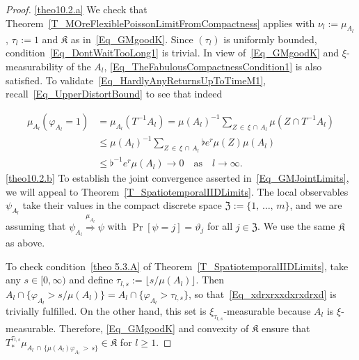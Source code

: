 \documentclass[10pt]{amsart}
\theoremstyle{definition}\newtheorem{defi}[theo]{Definition}\newtheorem{rema}[theo]{Remark}\newtheorem{exam}[theo]{Example}\newtheorem{exem}[theo]{Example}\newtheorem{nota}[theo]{Notation}
\newcommand{\frkK}{\mathfrak{K}}
\newcommand{\frkZ}{\mathfrak{Z}}
\begin{document}
\begin{proof}\leavevmode

\noindent\eqref{theo10.2.a} We check that Theorem~\ref{T_MOreFlexiblePoissonLimitFromCompactness} applies with $\nu_{l} :=\mu_{A_{l}}$, $\tau_{l}:=1$ and $\frkK$ as in~\eqref{Eq_GMgoodK}. Since $(\tau_{l})$ is uniformly bounded, condition~\eqref{Eq_DontWaitTooLong1} is trivial. In view of~\eqref{Eq_GMgoodK} and $\xi$-measurability of the $A_{l}$, \eqref{Eq_TheFabulousCompactnessCondition1} is also satisfied. To validate~\eqref{Eq_HardlyAnyReturnsUpToTimeM1}, recall~\eqref{Eq_UpperDistortBound} to see that indeed

\begin{align*}
\mu_{A_{l}}\left(\varphi_{A_{l}}=1\right) & =\mu_{A_{l}}\left(T^{-1}A_{l}\right) =\mu(A_{l})^{-1} {\textstyle\sum\nolimits_{Z\,\in\,\xi\,\cap\,A_{l}}}
\mu\left(Z\cap T^{-1}A_{l}\right)\\
& \leq\mu(A_{l})^{-1} {\textstyle\sum\nolimits_{Z\,\in\,\xi\,\cap\,A_{l}}}
\flat e^{r}\mu(Z)\mu(A_{l})\\
& \leq\flat^{-1}e^{r}\mu(A_{l})\longrightarrow0\quad\text{as}\quad l\rightarrow
\infty.
\end{align*}
\eqref{theo10.2.b} To establish the joint convergence asserted in~\eqref{Eq_GMJointLimits}, we will appeal to Theorem~\ref{T_SpatiotemporalIIDLimits}. The local observables $\psi_{A_{l}}$ take their values in the compact discrete space $\frkZ:=\{1,\,\ldots,\,m\}$, and we are assuming that $\psi_{A_{l}}\overset{\mu_{A_{l}}}{\Longrightarrow}\psi$ with $\Pr[\psi=j]=\vartheta_{j}$ for all $j\in\frkZ$. We use the same $\frkK$ as above.

To check condition~\eqref{theo 5.3.A} of Theorem~\ref{T_SpatiotemporalIIDLimits}, take any $s\in\lbrack0,\infty)$ and define $\tau_{l,s}:=\lfloor s/\mu (A_{l})\rfloor $. Then $A_{l}\cap\{\varphi_{A_{l}}>s/\mu(A_{l})\}=A_{l}\cap\{\varphi_{A_{l}}>\tau_{l,s}\}$, so that~\eqref{Eq_xdrxrxxdxrxdrxd} is trivially fulfilled. On the other hand, this set is $\xi_{\tau_{l,s}}$-measurable because $A_{l}$ is $\xi$-measurable. Therefore, \eqref{Eq_GMgoodK} and convexity of $\frkK$ ensure that $T_{\ast}^{\tau_{l,s}}\mu_{A_{l}\,\cap\,\{\mu(A_{l})\varphi_{A_{l}}\,>\,s\}}
\in\frkK$ for $l\geq1$.


\end{proof}
\end{document}
